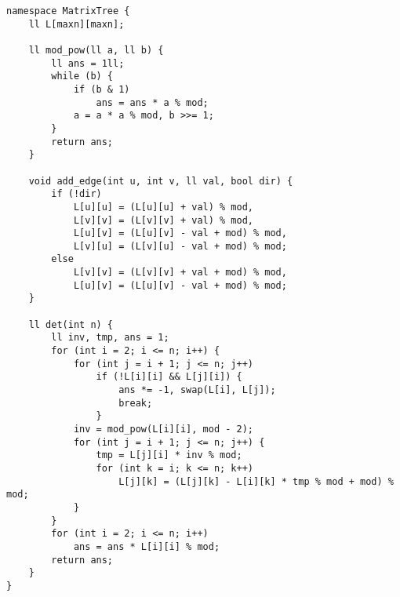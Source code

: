 \begin{verbatim}
namespace MatrixTree {
    ll L[maxn][maxn];

    ll mod_pow(ll a, ll b) {
        ll ans = 1ll;
        while (b) {
            if (b & 1)
                ans = ans * a % mod;
            a = a * a % mod, b >>= 1;
        }
        return ans;
    }

    void add_edge(int u, int v, ll val, bool dir) {
        if (!dir)
            L[u][u] = (L[u][u] + val) % mod,
            L[v][v] = (L[v][v] + val) % mod,
            L[u][v] = (L[u][v] - val + mod) % mod,
            L[v][u] = (L[v][u] - val + mod) % mod;
        else
            L[v][v] = (L[v][v] + val + mod) % mod,
            L[u][v] = (L[u][v] - val + mod) % mod;
    }

    ll det(int n) {
        ll inv, tmp, ans = 1;
        for (int i = 2; i <= n; i++) {
            for (int j = i + 1; j <= n; j++)
                if (!L[i][i] && L[j][i]) {
                    ans *= -1, swap(L[i], L[j]);
                    break;
                }
            inv = mod_pow(L[i][i], mod - 2);
            for (int j = i + 1; j <= n; j++) {
                tmp = L[j][i] * inv % mod;
                for (int k = i; k <= n; k++)
                    L[j][k] = (L[j][k] - L[i][k] * tmp % mod + mod) % mod;
            }
        }
        for (int i = 2; i <= n; i++)
            ans = ans * L[i][i] % mod;
        return ans;
    }
}
\end{verbatim}
